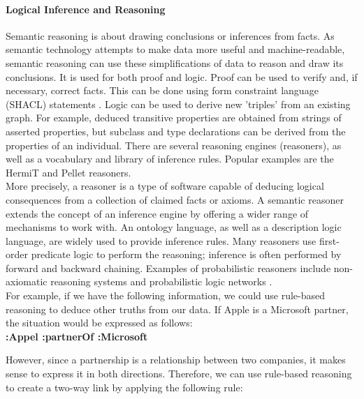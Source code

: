             \paragraph{Logical Inference and Reasoning \label{para:logInf}}
            Semantic reasoning is about drawing conclusions or inferences from facts. As semantic technology attempts to make data more useful and machine-readable, semantic reasoning can use these simplifications of data to reason and draw its conclusions. It is used for both proof and logic. Proof can be used to verify and, if necessary, correct facts. This can be done using form constraint language (SHACL) statements \cite{spelten2023simulation}. Logic can be used to derive new 'triples' from an existing graph. For example, deduced transitive properties are obtained from strings of asserted properties, but subclass and type declarations can be derived from the properties of an individual. There are several reasoning engines (reasoners), as well as a vocabulary and library of inference rules. Popular examples are the HermiT \cite{spelten2023simulation} and Pellet \cite{spelten2023simulation, chen2012recommendation} reasoners.\\
        
            More precisely, a reasoner is a type of software capable of deducing logical consequences from a collection of claimed facts or axioms. A semantic reasoner extends the concept of an inference engine by offering a wider range of mechanisms to work with. An ontology language, as well as a description logic language, are widely used to provide inference rules. Many reasoners use first-order predicate logic to perform the reasoning; inference is often performed by forward and backward chaining. Examples of probabilistic reasoners include non-axiomatic reasoning systems\cite{wang2000non} and probabilistic logic networks \cite{qu2019probabilistic}.\\
        
            For example, if we have the following information, we could use rule-based reasoning to deduce other truths from our data. If Apple is a Microsoft partner, the situation would be expressed as follows:\\
        
            \textbf{:Appel :partnerOf :Microsoft}
            
            However, since a partnership is a relationship between two companies, it makes sense to express it in both directions. Therefore, we can use rule-based reasoning to create a two-way link by applying the following rule:\\
        
